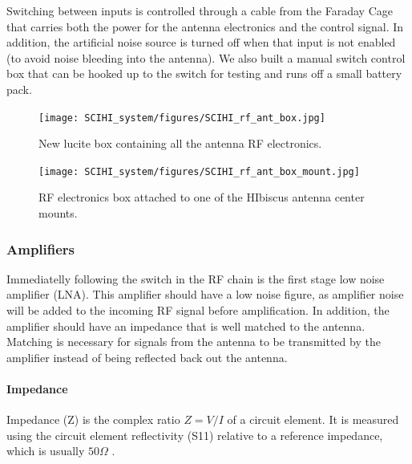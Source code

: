 Switching between inputs is controlled through a cable from the Faraday Cage that carries both the power for the antenna electronics and the control signal. In addition, the artificial noise source is turned off when that input is not enabled (to avoid noise bleeding into the antenna). We also built a manual switch control box that can be hooked up to the switch for testing and runs off a small battery pack. 

\begin{figure}[htb]
\centering
\begin{minipage}[b]{0.47\textwidth}
\centering
\texttt{[image: SCIHI\_system/figures/SCIHI\_rf\_ant\_box.jpg]}
\caption{New lucite box containing all the antenna RF electronics.}
\label{Fig:rf_ant_box}
\end{minipage}%
\begin{minipage}[b]{0.02\textwidth}
\hspace{1cm}
\end{minipage}%
\begin{minipage}[b]{0.47\textwidth}
\centering
\texttt{[image: SCIHI\_system/figures/SCIHI\_rf\_ant\_box\_mount.jpg]}
\caption{RF electronics box attached to one of the HIbiscus antenna center mounts.}
\label{Fig:rf_ant_mount}
\end{minipage}
\end{figure}

\subsubsection{Amplifiers} \label{Sec:Amp}

Immediatelly following the switch in the RF chain is the first stage low noise amplifier (LNA). This amplifier should have a low noise figure, as amplifier noise will be added to the incoming RF signal before amplification. In addition, the amplifier should have an impedance that is well matched to the antenna. Matching is necessary for signals from the antenna to be transmitted by the amplifier instead of being reflected back out the antenna. 

\paragraph{Impedance} 

Impedance (Z) is the complex ratio $Z = V/I$ of a circuit element. It is measured using the circuit element reflectivity (S11) relative to a reference impedance, which is usually $50 \Omega$ \cite{stutzman1981}.

